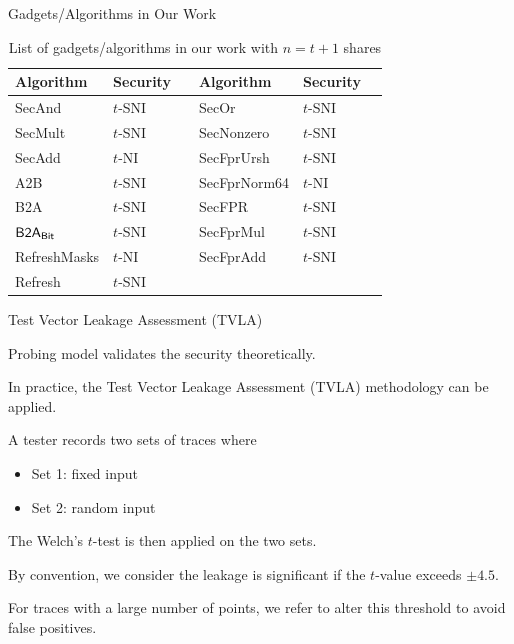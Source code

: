 \begin{frame}{Gadgets/Algorithms in Our Work}

\begin{table}
\centering
\begin{tabular}{l l | l l} 
\toprule
\textbf{Algorithm} & \textbf{Security$\quad$} & \textbf{Algorithm} & \textbf{Security$\quad$} \\
\midrule
{\sf SecAnd} & $t$-SNI & {\sf SecOr} & $t$-SNI \\
{\sf SecMult} & $t$-SNI & {\sf SecNonzero} & $t$-SNI \\
{\sf SecAdd} & $t$-NI & {\sf SecFprUrsh} & $t$-SNI \\
{\sf A2B} & $t$-SNI & {\sf SecFprNorm64} & $t$-NI\\
{\sf B2A} & $t$-SNI & {\sf SecFPR} & $t$-SNI \\
${\sf B2A_{Bit}}$ & $t$-SNI & {\sf SecFprMul} & $t$-SNI\\
{\sf RefreshMasks} & $t$-NI & {\sf SecFprAdd} & $t$-SNI\\
{\sf Refresh} & $t$-SNI \\
\bottomrule
\end{tabular}
\caption{List of gadgets/algorithms in our work with $n=t+1$ shares}
\label{table:gadgets_secureity}
\end{table}
\end{frame}

\begin{frame}{Test Vector Leakage Assessment (TVLA)}

Probing model validates the security theoretically.
\pause

In practice, the Test Vector Leakage Assessment (TVLA) methodology \cite{gilbert2011testing} can be applied.
\pause

A tester records two sets of traces where
\pause

\begin{itemize}
	\item Set 1: fixed input
	\pause
	\item Set 2: random input
\end{itemize}
\pause

The Welch's $t$-test is then applied on the two sets.
\pause

By convention, we consider the leakage is significant if the $t$-value exceeds $\pm 4.5$.
\pause

For traces with a large number of points, we refer to \cite{ding2018towards} alter this threshold to avoid false positives.

\end{frame}


